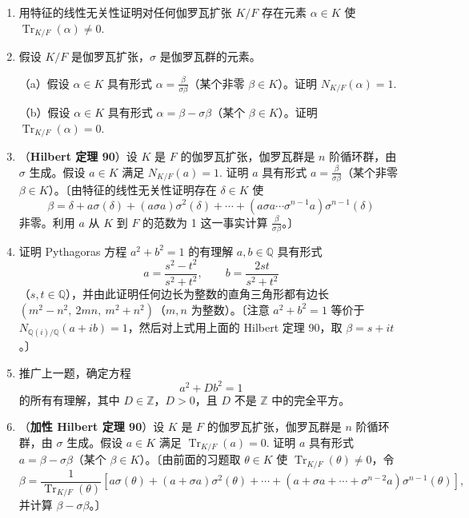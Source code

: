 \begin{enumerate}
\item 用特征的线性无关性证明对任何伽罗瓦扩张 \(K/F\) 存在元素 \(\alpha \in K\) 使 \(\operatorname{Tr}_{K/F}(\alpha) \neq 0\).

\item 假设 \(K/F\) 是伽罗瓦扩张，\(\sigma\) 是伽罗瓦群的元素。

（a）假设 \(\alpha \in K\) 具有形式 \(\alpha = \frac{\beta}{\sigma\beta}\)（某个非零 \(\beta \in K\)）。证明 \(N_{K/F}(\alpha) = 1\).

（b）假设 \(\alpha \in K\) 具有形式 \(\alpha = \beta-\sigma\beta\)（某个 \(\beta \in K\)）。证明 \(\operatorname{Tr}_{K/F}(\alpha) = 0\).

\item （\textbf{Hilbert 定理 90}）设 \(K\) 是 \(F\) 的伽罗瓦扩张，伽罗瓦群是 \(n\) 阶循环群，由 \(\sigma\) 生成。假设 \(a \in K\) 满足 \(N_{K/F}(a) = 1\). 证明 \(a\) 具有形式 \(a = \frac{\beta}{\sigma\beta}\)（某个非零 \(\beta \in K\)）。〔由特征的线性无关性证明存在 \(\delta \in K\) 使
\[
\beta = \delta+a\sigma(\delta)+(a\sigma a)\sigma^2(\delta)+\cdots+(a\sigma a\cdots\sigma^{n-1}a)\sigma^{n-1}(\delta)
\]
非零。利用 \(a\) 从 \(K\) 到 \(F\) 的范数为 1 这一事实计算 \(\frac{\beta}{\sigma\beta}\)。〕

\item 证明 Pythagoras 方程 \(a^2+b^2 = 1\) 的有理解 \(a, b \in \mathbb{Q}\) 具有形式
\[
a = \frac{s^2-t^2}{s^2+t^2}, \qquad b = \frac{2st}{s^2+t^2}
\]
（\(s, t \in \mathbb{Q}\)），并由此证明任何边长为整数的直角三角形都有边长 \((m^2-n^2,\ 2mn,\ m^2+n^2)\)（\(m, n\) 为整数）。〔注意 \(a^2+b^2 = 1\) 等价于 \(N_{\mathbb{Q}(i)/\mathbb{Q}}(a+ib) = 1\)，然后对上式用上面的 Hilbert 定理 90，取 \(\beta = s+it\)。〕

\item 推广上一题，确定方程
\[
a^2+Db^2 = 1
\]
的所有有理解，其中 \(D \in \mathbb{Z}\)，\(D > 0\)，且 \(D\) 不是 \(\mathbb{Z}\) 中的完全平方。

\item （\textbf{加性 Hilbert 定理 90}）设 \(K\) 是 \(F\) 的伽罗瓦扩张，伽罗瓦群是 \(n\) 阶循环群，由 \(\sigma\) 生成。假设 \(a \in K\) 满足 \(\operatorname{Tr}_{K/F}(a) = 0\). 证明 \(a\) 具有形式 \(a = \beta-\sigma\beta\)（某个 \(\beta \in K\)）。〔由前面的习题取 \(\theta \in K\) 使 \(\operatorname{Tr}_{K/F}(\theta) \neq 0\)，令
\[
\beta = \frac{1}{\operatorname{Tr}_{K/F}(\theta)}\left[a\sigma(\theta)+(a+\sigma a)\sigma^2(\theta)+\cdots+(a+\sigma a+\cdots+\sigma^{n-2}a)\sigma^{n-1}(\theta)\right],
\]
并计算 \(\beta-\sigma\beta\)。〕


\end{enumerate}
